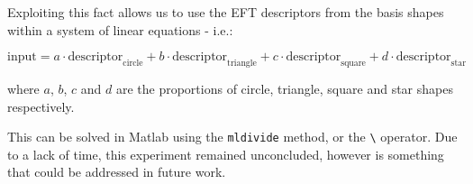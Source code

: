 Exploiting this fact allows us to use the \ac{EFT} descriptors from the basis shapes within a system of linear equations - i.e.:

\begin{equation}
    \mathrm{input} = a\cdot \mathrm{descriptor}_\mathrm{circle} + b\cdot \mathrm{descriptor}_\mathrm{triangle} + c\cdot \mathrm{descriptor}_\mathrm{square} + d\cdot \mathrm{descriptor}_\mathrm{star}
\end{equation}

where $a$, $b$, $c$ and $d$ are the proportions of circle, triangle, square and star shapes respectively. 

This can be solved in Matlab using the \texttt{mldivide} method, or the \texttt{\textbackslash} operator. Due to a lack of time, this experiment remained unconcluded, however is something that could be addressed in future work.

